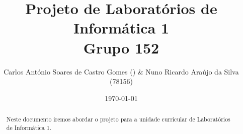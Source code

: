 \documentclass[a4paper]{article}
\title{Projeto de Laboratórios de Informática 1\\Grupo 152}
\author{Carlos António Soares de Castro Gomes () & Nuno Ricardo Araújo da Silva (78156)}
\date{\today}
\begin{document}
\maketitle

\begin{abstract}
	Neste documento iremos abordar o projeto para a unidade curricular de Laboratórios de Informática 1. 
\end{abstract}
\end{document}
